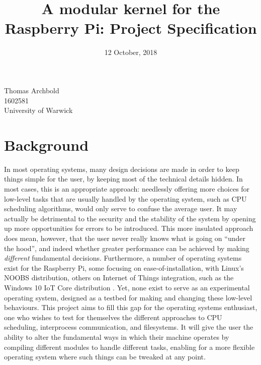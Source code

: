 \documentclass[10pt,a4paper]{article}
\title{A modular kernel for the Raspberry Pi: Project Specification}
\date{12 October, 2018}
\begin{document}
\maketitle

\begin{center}
    Thomas Archbold \\
    1602581 \\
    University of Warwick \\
\end{center}

\section*{Background}
In most operating systems, many design decisions are made in order to keep
things simple for the user, by keeping most of the technical details hidden. In
most cases, this is an appropriate approach: needlessly offering more choices
for low-level tasks that are usually handled by the operating system, such as
CPU scheduling algorithms, would only serve to confuse the average user. It may
actually be detrimental to the security and the stability of the system by
opening up more opportunities for errors to be introduced.  This more insulated
approach does mean, however, that the user never really knows what is going on
``under the hood'', and indeed whether greater performance can be achieved by
making \textit{different} fundamental decisions.  Furthermore, a number of
operating systems exist for the Raspberry Pi, some focusing on
ease-of-installation, with Linux's NOOBS \cite{NOOBS} distribution, others on
Internet of Things integration, such as the Windows 10 IoT Core distribution
\cite{IoT}. Yet, none exist to serve as an experimental operating system,
designed as a testbed for making and changing these low-level behaviours.  This
project aims to fill this gap for the operating systems enthusiast, one who
wishes to test for themselves the different approaches to CPU scheduling,
interprocess communication, and filesystems. It will give the user the ability
to alter the fundamental ways in which their machine operates by compiling
different modules to handle different tasks, enabling for a more flexible
operating system where such things can be tweaked at any point.
\end{document}
